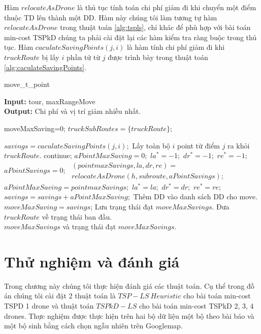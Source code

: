 \documentclass[a4paper,12pt]{report}
\begin{document}
Hàm $relocateAsDrone$ là thủ tục tính toán chi phí giảm đi khi chuyển một điểm thuộc \ac{TD} lên thành một \ac{DD}. Hàm này chúng tôi làm tương tự hàm $relocateAsDrone$ trong thuật toán \ref{alg:tspls}, chỉ khác để phù hợp với bài toán min-cost \ac{TSPkD} chúng ta phải cài đặt lại các hàm kiểm tra ràng buộc trong thủ tục. Hàm $caculateSavingPoints(j,i)$ là hàm tính chi phí giảm đi khi $truckRoute$ bị lấy $i$ phần tử từ $j$ được trình bày trong thuật toán \ref{alg:caculateSavingPoints}.
\begin{algorithm}[H]

\caption{move\_t\_point}
\textbf{Input:} tour, maxRangeMove\\
\textbf{Output:} Chi phí và vị trí giảm nhiều nhất.

\begin{algorithmic}[1]
\State moveMaxSaving=0;
\State $truckSubRoutes = \{truckRoute\};$

\State $savings=caculateSavingPoints(j,i);$
\State Lấy toàn bộ $i$ point từ điểm $j$ ra khỏi $truckRoute$.
\State continue;
\EndIf
{}
\State $aPointMaxSaving=0;$
\State $la^*=-1;$
\State $dr^*=-1;$
\State $re^*=-1;$
\State $aPointSavings=0;$
\State $\begin{array}{l}

(pointmaxSavings,la,dr,re)= \\ relocateAsDrone(h,subroute,aPointSavings);\end{array}$
\State $aPointMaxSaving=pointmaxSavings;$
\State $la^*=la;$
\State $dr^*=dr;$
\State $re^*=re;$
\EndIf
\EndFor	
\State $savings=savings+aPointMaxSaving;$
\State Thêm \ac{DD} vào danh sách \ac{DD} cho move.
\EndFor
\State $moveMaxSaving=savings$;
\State Lưu trạng thái đạt $moveMaxSavings$.
\EndIf
\State Đưa $truckRoute$ về trạng thái ban đầu.
\EndFor
\EndFor\\
\Return $moveMaxSavings$ và trạng thái đạt $moveMaxSavings$.
\end{algorithmic}
\label{alg:kpointmove}
\end{algorithm}

\chapter{Thử nghiệm và đánh giá}
Trong chương này chúng tôi thực hiện đánh giá các thuật toán. Cụ thể trong đồ án chúng tôi cài đặt 2 thuật toán là $TSP-LS \ Heuristic$ cho bài toán min-cost TSPD 1 drone và thuật toán $TSPkD-LS$ cho bài toán min-cost TSPkD 2, 3, 4 drones. Thực nghiệm được thực hiện trên  hai bộ dữ liệu một bộ theo bài báo \cite{main} và một bộ sinh bằng cách chọn ngẫu nhiên trên Googlemap. 
\end{document}
